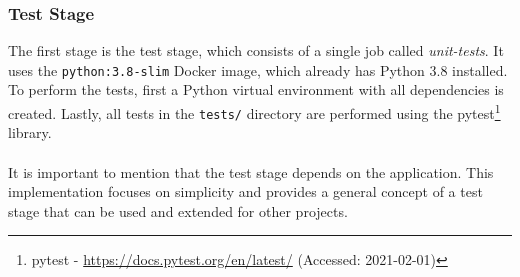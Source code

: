 \subsubsection{Test Stage}
The first stage is the test stage, which consists of a single job called \textit{unit-tests}.
It uses the \texttt{python:3.8-slim} Docker image, which already has Python 3.8 installed. To perform the tests, first a Python virtual environment with all dependencies is created. Lastly, all tests in the \texttt{tests/} directory are performed using the pytest\footnote{pytest - \url{https://docs.pytest.org/en/latest/} (Accessed: 2021-02-01)} library.


\paragraph{}
It is important to mention that the test stage depends on the application. This implementation focuses on simplicity and provides a general concept of a test stage that can be used and extended for other projects.


